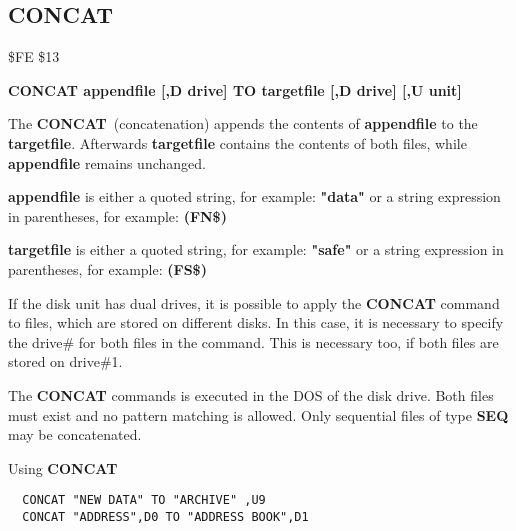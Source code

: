\subsection{CONCAT}
\begin{description}[leftmargin=2cm,style=nextline]
\item [Token:] \$FE \$13
\item [Format:] {\bf CONCAT appendfile [,D drive] TO
                targetfile [,D drive] [,U unit] }
\item [Usage:]
   The {\bf CONCAT} (concatenation) appends the contents of
   {\bf appendfile} to the {\bf targetfile}. Afterwards {\bf targetfile}
   contains the contents of both files, while {\bf appendfile}
   remains unchanged.

   {\bf appendfile} is either a quoted string, for example: {\bf "data"} or
   a string expression in parentheses, for example: {\bf (FN\$)}

   {\bf targetfile} is either a quoted string, for example: {\bf "safe"} or
   a string expression in parentheses, for example: {\bf (FS\$)}

   If the disk unit has dual drives, it is possible to apply
   the {\bf CONCAT} command to files, which are stored on different
   disks. In this case, it is necessary to specify the drive\#
   for both files in the command. This is necessary too, if both
   files are stored on drive\#1.

   \drivedefinition

   \unitdefinition

\item [Remarks:]
   The {\bf CONCAT} commands is executed in the DOS of the disk drive.
   Both files must exist and no pattern matching is allowed.
   Only sequential files of type {\bf SEQ} may be concatenated.

\item [Example:] Using {\bf CONCAT}
\begin{tcolorbox}[colback=black,coltext=white]
\verbatimfont{\codefont}
\begin{verbatim}
  CONCAT "NEW DATA" TO "ARCHIVE" ,U9
  CONCAT "ADDRESS",D0 TO "ADDRESS BOOK",D1
\end{verbatim}
\end{tcolorbox}
\end{description}


\newpage
